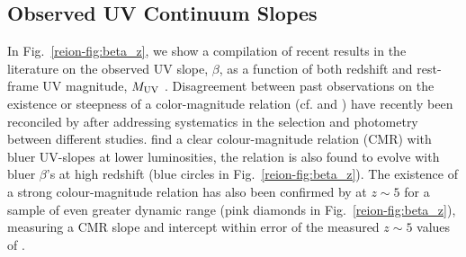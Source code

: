 \subsection{Observed UV Continuum Slopes}\label{reion-sec:betas}
In Fig.~\ref{reion-fig:beta_z}, we show a compilation of recent results in the literature on the observed UV slope, $\beta$, as a function of both redshift and rest-frame UV magnitude, $M_{\rm{UV}}$ \citep{Dunlop:2011jl,Dunlop:2013kp,Wilkins:2011fs,2012ApJ...756..164F,Bouwens:2013vf,Duncan:2014gh,Rogers:2014bn}. Disagreement between past observations on the existence or steepness of a color-magnitude relation (cf. \citet{Dunlop:2011jl} and \citet{Bouwens:2011tj}) have recently been reconciled by \citet{Bouwens:2013vf} after addressing systematics in the selection and photometry between different studies. \citet{Bouwens:2013vf} find a clear colour-magnitude relation (CMR) with bluer UV-slopes at lower luminosities, the relation is also found to evolve with bluer $\beta$'s at high redshift (blue circles in Fig.~\ref{reion-fig:beta_z}). The existence of a strong colour-magnitude relation has also been confirmed by \citet{Rogers:2014bn} at $z\sim5$ for a sample of even greater dynamic range (pink diamonds in Fig.~\ref{reion-fig:beta_z}), measuring a CMR slope and intercept within error of the measured $z\sim5$ values of \citet{Bouwens:2013vf}.

